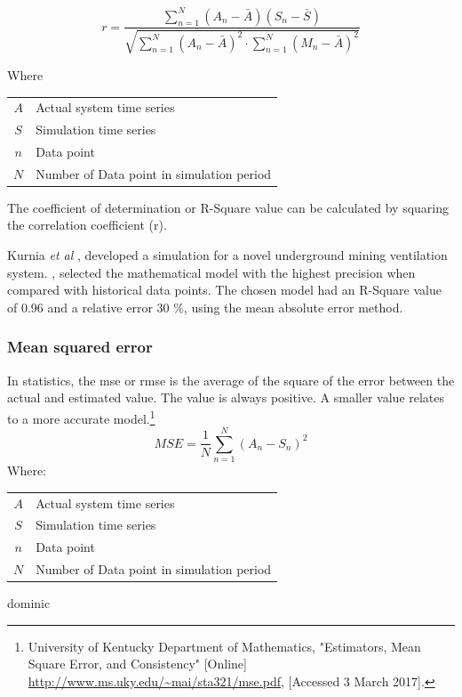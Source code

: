  		\begin{equation}
 		\label{eq: Correlation coefficient}
 		r = \dfrac{\sum_{n=1}^{N}(A_n - \bar{A})(S_n - \bar{S})}{\sqrt{\sum_{n=1}^{N}(A_n - \bar{A})^2 \cdot \sum_{n=1}^{N}(M_n - \bar{A})^2}}
 		\end{equation}
 		\par
 		Where \par
 		\begin{table}[h!]
 			\centering
 			\begin{tabular}{cl}
 				$A$ & Actual system time series \\
 				$S$ & Simulation time series \\
 				$n$ & Data point \\
 				$N$ & Number of Data point in simulation period \\
 			\end{tabular} 
 		\end{table}	
 		The coefficient of determination or R-Square value can be calculated by squaring the correlation coefficient (r). 
 		\par 
 			Kurnia \textit{et al} \cite{kurnia2014simulation},\cite{kurnia2014dust} developed a simulation for a novel underground mining ventilation system. \cite{kurnia2014simulation},\cite{kurnia2014dust} selected the mathematical model with the highest precision when compared with historical data points. The chosen model had an R-Square value of 0.96 and a relative error 30 \%, using the mean absolute error method. 
 			
 		\subsubsection{Mean squared error}	
 		In statistics, the \gls{mse} or \gls{rmse} is the average of the square of the error between the actual and estimated value. The value is always positive. A smaller value relates to a more accurate model.\footnote{University of Kentucky Department of Mathematics, "Estimators, Mean Square Error, and
 			Consistency" [Online] \url{http://www.ms.uky.edu/~mai/sta321/mse.pdf}, [Accessed 3 March 2017].}
 			\begin{equation}
 				\label{eq: rmse}
 				MSE = \dfrac{1}{N}\sum_{n=1}^{N}{(A_{n} - S_{n})^2}
 			\end{equation}
 			Where: \par
 			\begin{table}[h!]
 				\centering
 				\begin{tabular}{cl}
 					$A$ & Actual system time series \\
 					$S$ & Simulation time series \\
 					$n$ & Data point \\
 					$N$ & Number of Data point in simulation period \\
 			\end{tabular} 
 			\end{table}
 		\par
 		dominic \cite{dominic2014dynamic}	
